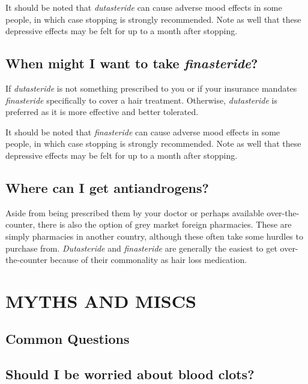 \documentclass{article}
\begin{document}
It should be noted that \textit{dutasteride} can cause adverse mood effects in some people, in which case stopping is strongly recommended. Note as well that these depressive effects may be felt for up to a month after stopping. 

\subsection{When might I want to take \textit{finasteride}?}

If \textit{dutasteride }is not something prescribed to you or if your insurance mandates \textit{finasteride} specifically to cover a hair treatment. Otherwise, \textit{dutasteride} is preferred as it is more effective and better tolerated.

It should be noted that \textit{finasteride} can cause adverse mood effects in some people, in which case stopping is strongly recommended. Note as well that these depressive effects may be felt for up to a month after stopping.

\subsection{Where can I get antiandrogens?}

Aside from being prescribed them by your doctor or perhaps available over-the-counter, there is also the option of grey market foreign pharmacies. These are simply pharmacies in another country, although these often take some hurdles to purchase from. \textit{Dutasteride} and \textit{finasteride }are generally the easiest to get over-the-counter because of their commonality as hair loss medication.

 

\section{MYTHS AND MISCS}\label{MM}

\subsection*{Common Questions}

\subsection{Should I be worried about blood clots?}\label{11-1}
\end{document}
